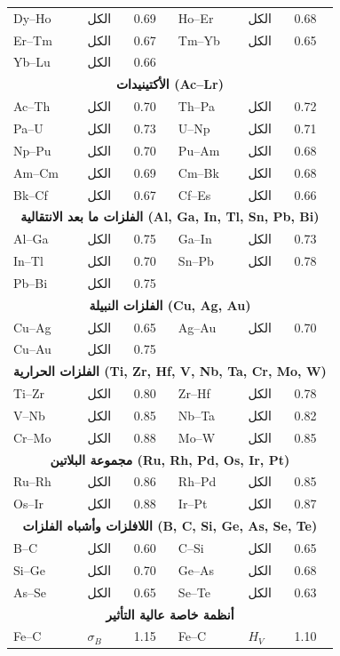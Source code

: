 \documentclass[11pt,a4paper]{article}
\begin{document}
\begin{otherlanguage}{arabic}
\begin{longtable}{p{1.5cm}p{1.5cm}p{1.2cm}p{1.2cm}p{1.2cm}p{1.2cm}}
			Dy–Ho & الكل & 0.69 & Ho–Er & الكل & 0.68 \\
			Er–Tm & الكل & 0.67 & Tm–Yb & الكل & 0.65 \\
			Yb–Lu & الكل & 0.66 & & & \\
			\multicolumn{6}{c}{\textbf{الأكتينيدات (Ac–Lr)}} \\
			Ac–Th & الكل & 0.70 & Th–Pa & الكل & 0.72 \\
			Pa–U  & الكل & 0.73 & U–Np & الكل & 0.71 \\
			Np–Pu & الكل & 0.70 & Pu–Am & الكل & 0.68 \\
			Am–Cm & الكل & 0.69 & Cm–Bk & الكل & 0.68 \\
			Bk–Cf & الكل & 0.67 & Cf–Es & الكل & 0.66 \\
			\multicolumn{6}{c}{\textbf{الفلزات ما بعد الانتقالية (Al, Ga, In, Tl, Sn, Pb, Bi)}} \\
			Al–Ga & الكل & 0.75 & Ga–In & الكل & 0.73 \\
			In–Tl & الكل & 0.70 & Sn–Pb & الكل & 0.78 \\
			Pb–Bi & الكل & 0.75 & & & \\
			\multicolumn{6}{c}{\textbf{الفلزات النبيلة (Cu, Ag, Au)}} \\
			Cu–Ag & الكل & 0.65 & Ag–Au & الكل & 0.70 \\
			Cu–Au & الكل & 0.75 & & & \\
			\multicolumn{6}{c}{\textbf{الفلزات الحرارية (Ti, Zr, Hf, V, Nb, Ta, Cr, Mo, W)}} \\
			Ti–Zr & الكل & 0.80 & Zr–Hf & الكل & 0.78 \\
			V–Nb & الكل & 0.85 & Nb–Ta & الكل & 0.82 \\
			Cr–Mo & الكل & 0.88 & Mo–W & الكل & 0.85 \\
			\multicolumn{6}{c}{\textbf{مجموعة البلاتين (Ru, Rh, Pd, Os, Ir, Pt)}} \\
			Ru–Rh & الكل & 0.86 & Rh–Pd & الكل & 0.85 \\
			Os–Ir & الكل & 0.88 & Ir–Pt & الكل & 0.87 \\
			\multicolumn{6}{c}{\textbf{اللافلزات وأشباه الفلزات (B, C, Si, Ge, As, Se, Te)}} \\
			B–C  & الكل & 0.60 & C–Si  & الكل & 0.65 \\
			Si–Ge & الكل & 0.70 & Ge–As & الكل & 0.68 \\
			As–Se & الكل & 0.65 & Se–Te & الكل & 0.63 \\
			\multicolumn{6}{c}{\textbf{أنظمة خاصة عالية التأثير}} \\
			Fe–C  & \(\sigma_B\) & 1.15 & Fe–C  & \(H_V\) & 1.10 \\

\end{longtable}
\end{otherlanguage}
\end{document}
